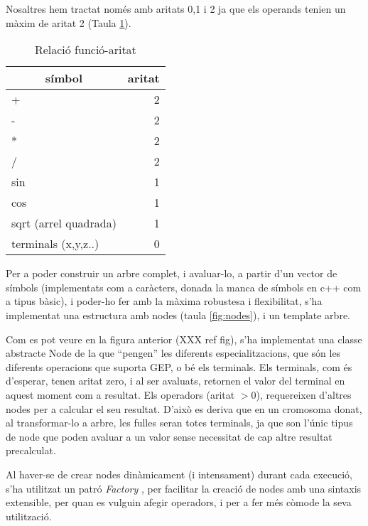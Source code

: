 Nosaltres hem tractat només amb aritats 0,1 i 2 ja que els
operands tenien un màxim de aritat 2 (Taula \ref{table:func-aritat}).


\begin{table}
\centering
\caption{Relació funció-aritat}
\begin{tabular}{|l|r|}
\hline
\multicolumn{1}{|c|}{\textbf{símbol }} & \multicolumn{1}{c|}{\textbf{ aritat}} \\
\hline
\hline
+                     & 2 \\
-                     & 2 \\
*                     & 2 \\
/                     & 2 \\
sin                   & 1 \\
cos                   & 1 \\
sqrt (arrel quadrada) & 1 \\
terminals (x,y,z..)   & 0 \\
\hline
\end{tabular}
\label{table:func-aritat}
\end{table}

Per a poder construir un arbre complet, i avaluar-lo, a partir d'un vector de
símbols (implementats com a caràcters, donada la manca de símbols en c++ com a
tipus bàsic), i poder-ho fer amb la màxima robustesa i flexibilitat, s'ha
implementat una estructura amb nodes (taula \ref{fig:nodes}), i un template arbre. 


Com es pot veure en la figura anterior (XXX ref fig), s'ha implementat una
classe abstracte Node de la que ``pengen'' les diferents especialitzacions, que
són les diferents operacions que suporta GEP, o bé els terminals. Els terminals,
com és d'esperar, tenen aritat zero, i al ser avaluats, retornen el valor del
terminal en aquest moment com a resultat.  Els operadors (aritat $>0$),
requereixen d'altres nodes per a calcular el seu resultat.  D'això es deriva que
en un cromosoma donat, al transformar-lo a arbre, les fulles seran totes
terminals, ja que son l'únic tipus de node que poden avaluar a un valor sense
necessitat de cap altre resultat precalculat.

Al haver-se de crear nodes dinàmicament (i intensament) durant cada execució,
s'ha utilitzat un patró \emph{Factory} \cite{GoF94}, per facilitar la creació de nodes amb
una sintaxis extensible, per quan es vulguin afegir operadors, i per a fer més
còmode la seva utilització.

